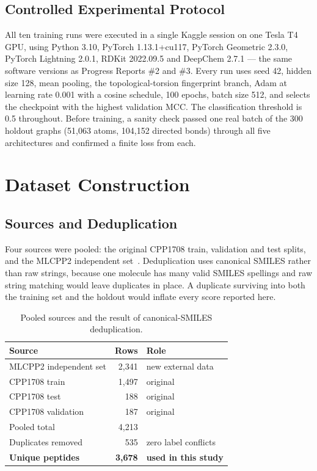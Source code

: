 \documentclass[11pt,a4paper]{article}
\begin{document}
\subsection{Controlled Experimental Protocol}
All ten training runs were executed in a single Kaggle session on one Tesla T4 GPU, using Python 3.10,
PyTorch 1.13.1+cu117, PyTorch Geometric 2.3.0, PyTorch Lightning 2.0.1, RDKit 2022.09.5 and DeepChem
2.7.1 --- the same software versions as Progress Reports \#2 and \#3. Every run uses seed 42, hidden
size 128, mean pooling, the topological-torsion fingerprint branch, Adam at learning rate 0.001 with a
cosine schedule, 100 epochs, batch size 512, and selects the checkpoint with the highest validation MCC.
The classification threshold is 0.5 throughout. Before training, a sanity check passed one real batch of
the 300 holdout graphs (51{,}063 atoms, 104{,}152 directed bonds) through all five architectures and
confirmed a finite loss from each.

\section{Dataset Construction}

\subsection{Sources and Deduplication}
Four sources were pooled: the original CPP1708 train, validation and test splits, and the MLCPP2
independent set~\cite{mlcpp}. Deduplication uses canonical SMILES rather than raw strings, because one
molecule has many valid SMILES spellings and raw string matching would leave duplicates in place. A
duplicate surviving into both the training set and the holdout would inflate every score reported here.

\begin{table}[h]
\centering\small
\begin{tabular}{@{}lrl@{}}
\toprule
\sffamily\bfseries\color{navy}Source & \sffamily\bfseries\color{navy}Rows & \sffamily\bfseries\color{navy}Role\\
\midrule
MLCPP2 independent set & 2{,}341 & new external data\\
CPP1708 train          & 1{,}497 & original\\
CPP1708 test           &    188 & original\\
CPP1708 validation     &    187 & original\\
\midrule
Pooled total           & 4{,}213 & \\
Duplicates removed     &    535 & zero label conflicts\\
\textbf{Unique peptides} & \textbf{3{,}678} & \textbf{used in this study}\\
\bottomrule
\end{tabular}
\caption{Pooled sources and the result of canonical-SMILES deduplication.}
\end{table}
\end{document}
